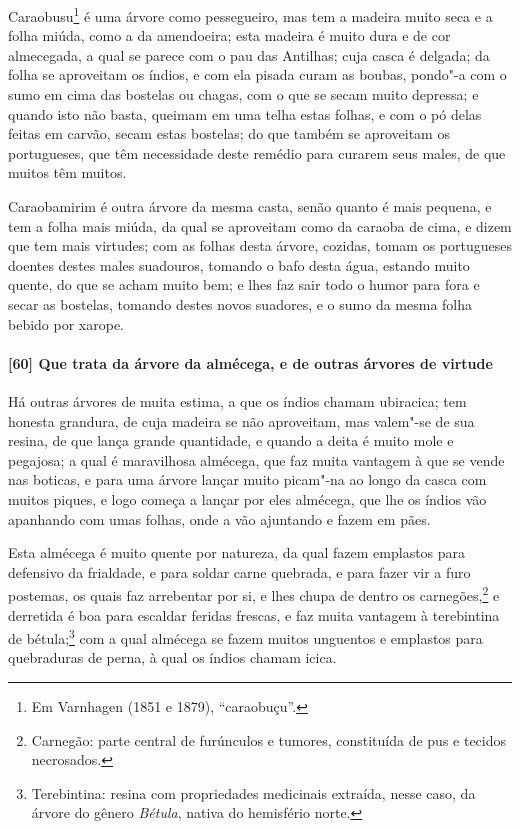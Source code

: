 \begin{linenumbers}
Caraobusu\footnote{ Em Varnhagen (1851 e 1879), ``caraobuçu''.} é uma árvore como
pessegueiro, mas tem a madeira muito seca e a folha miúda, como a da amendoeira; esta
madeira é muito dura e de cor almecegada, a qual se parece com o pau das Antilhas; cuja
casca é delgada; da folha se aproveitam os índios, e com ela pisada curam as boubas,
pondo"-a com o sumo em cima das bostelas ou chagas, com o que se secam muito depressa; e
quando isto não basta, queimam em uma telha estas folhas, e com o pó delas feitas em
carvão, secam estas bostelas; do que também se aproveitam os portugueses, que têm
necessidade deste remédio para curarem seus males, de que muitos têm muitos.

Caraobamirim é outra árvore da mesma casta, senão quanto é mais pequena, e tem a folha
mais miúda, da qual se aproveitam como da caraoba de cima, e dizem que tem mais virtudes;
com as folhas desta árvore, cozidas, tomam os portugueses doentes destes males suadouros,
tomando o bafo desta água, estando muito quente, do que se acham muito bem; e lhes faz
sair todo o humor para fora e secar as bostelas, tomando destes novos suadores, e o sumo
da mesma folha bebido por xarope.

\paragraph{[60] Que trata da árvore da almécega, e de outras árvores de virtude}\quad
Há outras árvores de muita estima, a que os índios chamam ubiracica; tem honesta grandura,
de cuja madeira se não aproveitam, mas valem"-se de sua resina, de que lança grande
quantidade, e quando a deita é muito mole e pegajosa; a qual é maravilhosa almécega, que
faz muita vantagem à que se vende nas boticas, e para uma árvore lançar muito picam"-na ao
longo da casca com muitos piques, e logo começa a lançar por eles almécega, que lhe os
índios vão apanhando com umas folhas, onde a vão ajuntando e fazem em pães.

Esta almécega é muito quente por natureza, da qual fazem emplastos para defensivo da
frialdade, e para soldar carne quebrada, e para fazer vir a furo postemas, os quais faz
arrebentar por si, e lhes chupa de dentro os carnegões,\footnote{ Carnegão: parte central
de furúnculos e tumores, constituída de pus e tecidos necrosados.} e derretida é boa para
escaldar feridas frescas, e faz muita vantagem à terebintina de bétula;\footnote{
Terebintina: resina com propriedades medicinais extraída, nesse caso, da árvore do gênero
\textit{Bétula}, nativa do hemisfério norte.} com a qual almécega se fazem muitos
unguentos e emplastos para quebraduras de perna, à qual os índios chamam icica.


\end{linenumbers}
